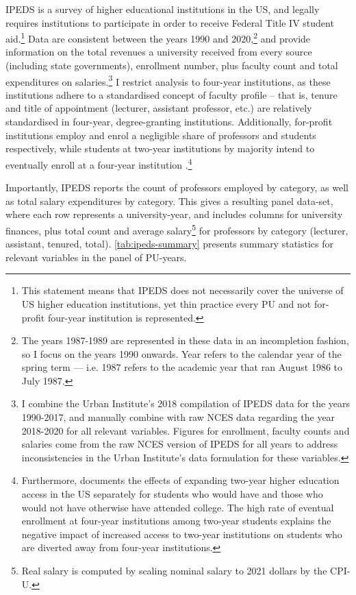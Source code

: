 \documentclass[notitlepage,12pt]{article}
\begin{document}
IPEDS is a survey of higher educational institutions in the US, and legally requires institutions to participate in order to receive Federal Title IV student aid.\footnote{
    This statement means that IPEDS does not necessarily cover the universe of US higher education institutions, yet thin practice every PU and not for-profit four-year institution is represented.
}
Data are consistent between the years 1990 and 2020,\footnote{
    The years 1987-1989 are represented in these data in an incompletion fashion, so I focus on the years 1990 onwards.
    Year refers to the calendar year of the spring term --- i.e. 1987 refers to the academic year that ran August 1986 to July 1987.
}
and provide information on the total revenues a university received from every source (including state governments), enrollment number, plus faculty count and total expenditures on salaries.\footnote{
    I combine the Urban Institute's 2018 compilation of IPEDS data for the years 1990-2017, and manually combine with raw NCES data regarding the year 2018-2020 for all relevant variables.
    Figures for enrollment, faculty counts and salaries come from the raw NCES version of IPEDS for all years to address inconsistencies in the Urban Institute's data formulation for these variables.
}
I restrict analysis to four-year institutions, as these institutions adhere to a standardised concept of faculty profile -- that is, tenure and title of appointment (lecturer, assistant professor, etc.) are relatively standardised in four-year, degree-granting institutions.
Additionally, for-profit institutions employ and enrol a negligible share of professors and students respectively, while students at two-year institutions by majority intend to eventually enroll at a four-year institution \citep{mountjoy2022}.\footnote{
    Furthermore, \cite{mountjoy2022} documents the effects of expanding two-year higher education access in the US separately for students who would have and those who would not have otherwise have attended college.
    The high rate of eventual enrollment at four-year institutions among two-year students explains the negative impact of increased access to two-year institutions on students who are diverted away from four-year institutions.
}

Importantly, IPEDS reports the count of professors employed by category, as well as total salary expenditures by category.
This gives a resulting panel data-set, where each row represents a university-year, and includes columns for university finances, plus total count and average salary\footnote{
    Real salary is computed by scaling nominal salary to 2021 dollars by the CPI-U.
} for professors by category (lecturer, assistant, tenured, total).
\autoref{tab:ipeds-summary} presents summary statistics for relevant variables in the panel of PU-years.
\end{document}
